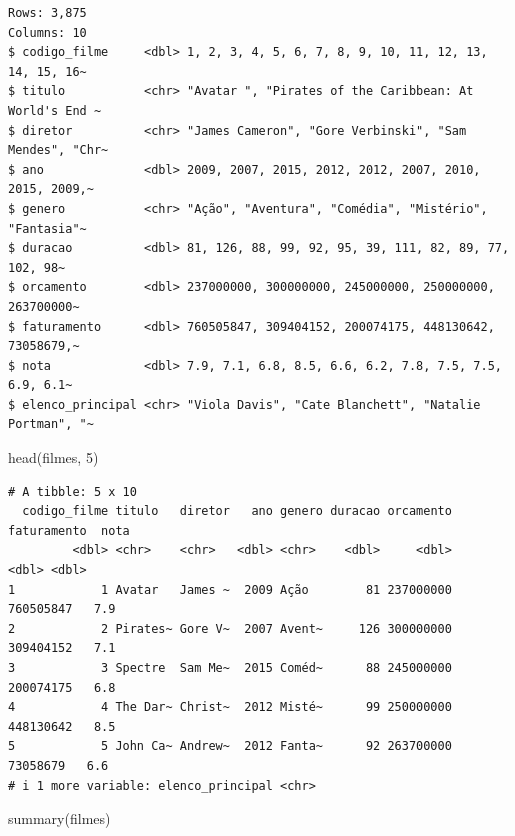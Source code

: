 \documentclass[
  letterpaper,
]{scrbook}
\newenvironment{Shaded}{\begin{snugshade}}{\end{snugshade}}
\newcommand{\DecValTok}[1]{\textcolor[rgb]{0.68,0.00,0.00}{#1}}
\newcommand{\FunctionTok}[1]{\textcolor[rgb]{0.28,0.35,0.67}{#1}}
\newcommand{\NormalTok}[1]{\textcolor[rgb]{0.00,0.23,0.31}{#1}}
\begin{document}
\begin{verbatim}
Rows: 3,875
Columns: 10
$ codigo_filme     <dbl> 1, 2, 3, 4, 5, 6, 7, 8, 9, 10, 11, 12, 13, 14, 15, 16~
$ titulo           <chr> "Avatar ", "Pirates of the Caribbean: At World's End ~
$ diretor          <chr> "James Cameron", "Gore Verbinski", "Sam Mendes", "Chr~
$ ano              <dbl> 2009, 2007, 2015, 2012, 2012, 2007, 2010, 2015, 2009,~
$ genero           <chr> "Ação", "Aventura", "Comédia", "Mistério", "Fantasia"~
$ duracao          <dbl> 81, 126, 88, 99, 92, 95, 39, 111, 82, 89, 77, 102, 98~
$ orcamento        <dbl> 237000000, 300000000, 245000000, 250000000, 263700000~
$ faturamento      <dbl> 760505847, 309404152, 200074175, 448130642, 73058679,~
$ nota             <dbl> 7.9, 7.1, 6.8, 8.5, 6.6, 6.2, 7.8, 7.5, 7.5, 6.9, 6.1~
$ elenco_principal <chr> "Viola Davis", "Cate Blanchett", "Natalie Portman", "~
\end{verbatim}

\begin{Shaded}
\begin{Highlighting}[]
\FunctionTok{head}\NormalTok{(filmes, }\DecValTok{5}\NormalTok{)}
\end{Highlighting}
\end{Shaded}

\begin{verbatim}
# A tibble: 5 x 10
  codigo_filme titulo   diretor   ano genero duracao orcamento faturamento  nota
         <dbl> <chr>    <chr>   <dbl> <chr>    <dbl>     <dbl>       <dbl> <dbl>
1            1 Avatar   James ~  2009 Ação        81 237000000   760505847   7.9
2            2 Pirates~ Gore V~  2007 Avent~     126 300000000   309404152   7.1
3            3 Spectre  Sam Me~  2015 Coméd~      88 245000000   200074175   6.8
4            4 The Dar~ Christ~  2012 Misté~      99 250000000   448130642   8.5
5            5 John Ca~ Andrew~  2012 Fanta~      92 263700000    73058679   6.6
# i 1 more variable: elenco_principal <chr>
\end{verbatim}

\begin{Shaded}
\begin{Highlighting}[]
\FunctionTok{summary}\NormalTok{(filmes)}
\end{Highlighting}
\end{Shaded}
\end{document}
